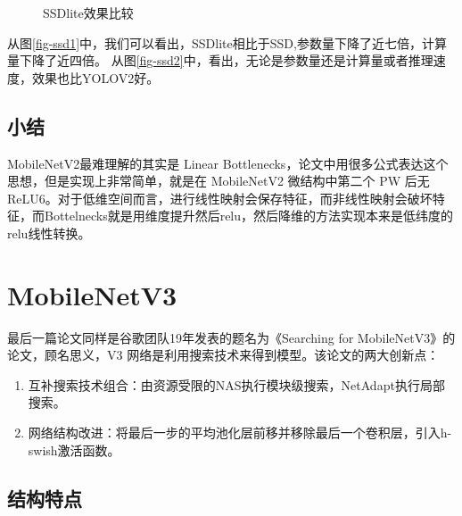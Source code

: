 \documentclass[UTF8,a4paper,12pt]{ctexart}
\begin{document}
 
 \begin{figure}[htbp]
 	\centering
 	\quad
 	\caption{SSDlite效果比较}
 	\label{fig-ssdlite}
 \end{figure}
 
 从图\ref{fig-ssd1}中，我们可以看出，SSDlite相比于SSD\cite{21},参数量下降了近七倍，计算量下降了近四倍。
 从图\ref{fig-ssd2}中，看出，无论是参数量还是计算量或者推理速度，效果也比YOLOV2\cite{YOLO9000}好。
 
 \subsection{小结}
 MobileNetV2最难理解的其实是 Linear Bottlenecks，论文中用很多公式表达这个思想，但是实现上非常简单，就是在 MobileNetV2 微结构中第二个 PW 后无 ReLU6。对于低维空间而言，进行线性映射会保存特征，而非线性映射会破坏特征，而Bottelnecks就是用维度提升然后relu，然后降维的方法实现本来是低纬度的relu线性转换。
 
 
 
 
 
\section{MobileNetV3}
最后一篇论文同样是谷歌团队19年发表的题名为《Searching for MobileNetV3》\cite{MobV3}的论文，顾名思义，V3 网络是利用搜索技术来得到模型。该论文的两大创新点：
\begin{enumerate}
	\item 互补搜索技术组合：由资源受限的NAS\cite{NasNet}执行模块级搜索，NetAdapt\cite{NetAdapt}执行局部搜索。
	\item  网络结构改进：将最后一步的平均池化层前移并移除最后一个卷积层，引入h-swish激活函数。
\end{enumerate}

\subsection{结构特点}
\end{document}
